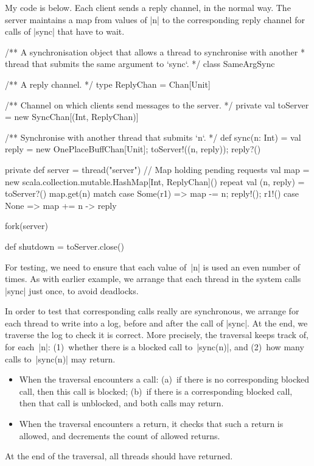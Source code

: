 \begin{answerI}
My code is below.  Each client sends a reply channel, in the normal way.  The
server maintains a map from values of |n| to the corresponding reply channel
for calls of |sync| that have to wait. 
%
\begin{scala}
/** A synchronisation object that allows a thread to synchronise with another
  * thread that submits the same argument to `sync`. */
class SameArgSync{
  /** A reply channel. */
  type ReplyChan = Chan[Unit]

  /** Channel on which clients send messages to the server. */
  private val toServer = new SyncChan[(Int, ReplyChan)]

  /** Synchronise with another thread that submits `n`. */
  def sync(n: Int) = {
    val reply = new OnePlaceBuffChan[Unit]; toServer!((n, reply)); reply?()
  }

  private def server = thread("server"){
    // Map holding pending requests
    val map = new scala.collection.mutable.HashMap[Int, ReplyChan]()
    repeat{
      val (n, reply) = toServer?()
      map.get(n) match{
        case Some(r1) => map -= n; reply!(); r1!()
        case None => map += n -> reply
      }
    }
  }

  fork(server)

  def shutdown = toServer.close()
}
\end{scala}

For testing, we need to ensure that each value of~|n| is used an even number
of times.  As with earlier example, we arrange that each thread in the system
calls |sync| just once, to avoid deadlocks.

In order to test that corresponding calls really are synchronous, we arrange
for each thread to write into a log, before and after the call of |sync|.  At
the end, we traverse the log to check it is correct.  More precisely, the
traversal keeps track of, for each~|n|: (1)~whether there is a blocked call
to~|sync(n)|, and (2)~how many calls to~|sync(n)| may return.
\begin{itemize}
\item When the traversal encounters a call: (a)~if there is no corresponding
  blocked call, then this call is blocked; (b)~if there is a corresponding
  blocked call, then that call is unblocked, and both calls may return. 

\item When the traversal encounters a return, it checks that such a return is
  allowed, and decrements the count of allowed returns.
\end{itemize}
At the end of the traversal, all threads should have returned.  


\end{answerI}
